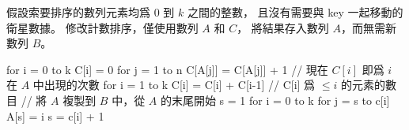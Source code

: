 \startEXERCISE
假設索要排序的數列元素均爲 $0$ 到 $k$ 之間的整數，
且沒有需要與 key 一起移動的衛星數據。
修改計數排序，僅使用數列 $A$ 和 $C$，
將結果存入數列 $A$，而無需新數列 $B$。
\stopEXERCISE

\startANSWER
{}
\startCLRSCODE
{}
for i = 0 to k
	C[i] = 0
for j = 1 to n
	C[A[j]] = C[A[j]] + 1
// 現在 $C[i]$ 即爲 $i$ 在 $A$ 中出現的次數
for i = 1 to k
	C[i] = C[i] + C[i-1]
// C[i] 爲 $\le i$ 的元素的數目
// 將 $A$ 複製到 $B$ 中，從 $A$ 的末尾開始
s = 1
for i = 0 to k
	for j = s to c[i]
		A[s] = i
	s = c[i] + 1
\stopCLRSCODE
\stopANSWER
